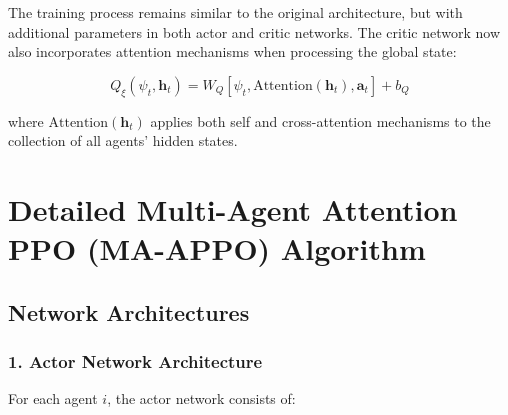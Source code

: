 The training process remains similar to the original architecture, but with additional parameters in both actor and critic networks. The critic network now also incorporates attention mechanisms when processing the global state:

\[
Q_{\xi}(\psi_t, \mathbf{h}_t) = W_Q[\psi_t, \text{Attention}(\mathbf{h}_t), \mathbf{a}_t] + b_Q
\]

where $\text{Attention}(\mathbf{h}_t)$ applies both self and cross-attention mechanisms to the collection of all agents' hidden states.

\section*{Detailed Multi-Agent Attention PPO (MA-APPO) Algorithm}

\subsection*{Network Architectures}

\subsubsection*{1. Actor Network Architecture}

For each agent $i$, the actor network consists of:

